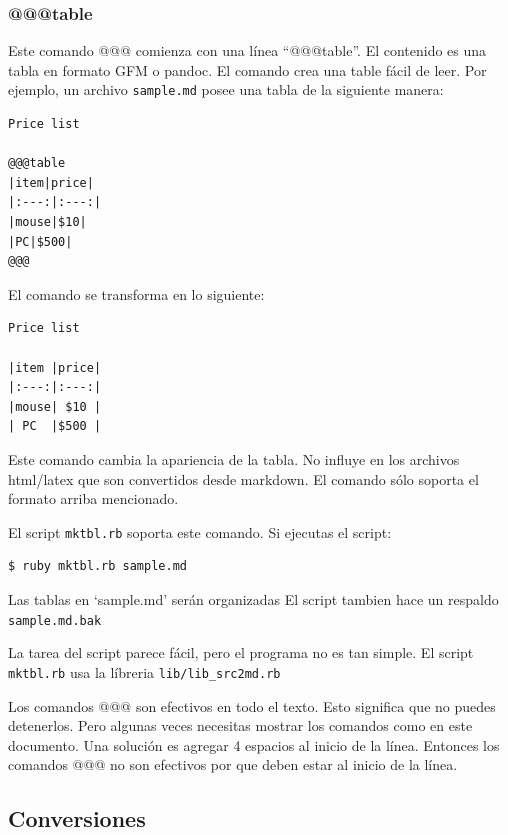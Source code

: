 \hypertarget{table}{%
\subsubsection{@@@table}\label{table}}

Este comando @@@ comienza con una línea ``@@@table''. El contenido es
una tabla en formato GFM o pandoc. El comando crea una table fácil de
leer. Por ejemplo, un archivo \texttt{sample.md} posee una tabla de la
siguiente manera:

\begin{verbatim}
Price list

@@@table
|item|price|
|:---:|:---:|
|mouse|$10|
|PC|$500|
@@@
\end{verbatim}

El comando se transforma en lo siguiente:

\begin{verbatim}
Price list

|item |price|
|:---:|:---:|
|mouse| $10 |
| PC  |$500 |
\end{verbatim}

Este comando cambia la apariencia de la tabla. No influye en los
archivos html/latex que son convertidos desde markdown. El comando sólo
soporta el formato arriba mencionado.

El script \texttt{mktbl.rb} soporta este comando. Si ejecutas el script:

\begin{verbatim}
$ ruby mktbl.rb sample.md
\end{verbatim}

Las tablas en `sample.md' serán organizadas El script tambien hace un
respaldo \texttt{sample.md.bak}

La tarea del script parece fácil, pero el programa no es tan simple. El
script \texttt{mktbl.rb} usa la líbreria \texttt{lib/lib\_src2md.rb}

Los comandos @@@ son efectivos en todo el texto. Esto significa que no
puedes detenerlos. Pero algunas veces necesitas mostrar los comandos
como en este documento. Una solución es agregar 4 espacios al inicio de
la línea. Entonces los comandos @@@ no son efectivos por que deben estar
al inicio de la línea.

\hypertarget{conversiones}{%
\subsection{Conversiones}\label{conversiones}}

